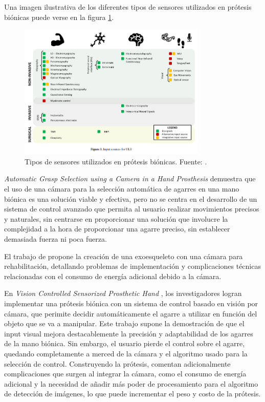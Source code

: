 Una imagen ilustrativa de los diferentes tipos de sensores utilizados en prótesis biónicas puede verse en la figura \ref{figuras/review2023.png}.
\begin{figure}[H]
    \centering
    \includegraphics[width=0.8\textwidth]{figuras/review2023.png}
    \caption{Tipos de sensores utilizados en prótesis biónicas. Fuente: \citep{bionicreview2023}.}
    \label{figuras/review2023.png}
\end{figure}




\textit{Automatic Grasp Selection using a Camera in a Hand Prosthesis} \citep{automgrasp2016} demuestra que el uso de una cámara para la selección automática de agarres en una mano biónica es una solución viable y efectiva, pero no se centra en el desarrollo de un sistema de control avanzado que permita al usuario realizar movimientos precisos y naturales, sin centrarse en proporcionar una solución que involucre la complejidad a la hora de proporcionar una agarre preciso, sin establecer demasiada fuerza ni poca fuerza.

El trabajo de \citet{blais2025vision} propone la creación de una exoesqueleto con una cámara para rehabilitación, detallando problemas de implementación y complicaciones técnicas relacionadas con el consumo de energía adicional debido a la cámara. 

En \textit{Vision Controlled Sensorized Prosthetic Hand} \citep{sarker2024vision} , los investigadores logran implementar una prótesis biónica con un sistema de control basado en visión por cámara, que perimite decidir automáticamente el agarre a utilizar en función del objeto que se va a manipular. Este trabajo supone la demostración de que el input visual mejora destacablemente la precisión y adaptabilidad de los agarres de la mano biónica. Sin embargo, el usuario pierde el control sobre el agarre, quedando completamente a merced de la cámara y el algoritmo usado para la selección de control. Construyendo la prótesis, comentan adicionalmente complicaciones que surgen al integrar la cámara, como el consumo de energía adicional y la necesidad de añadir más poder de procesamiento para el algoritmo de detección de imágenes, lo que puede incrementar el peso y costo de la prótesis.

